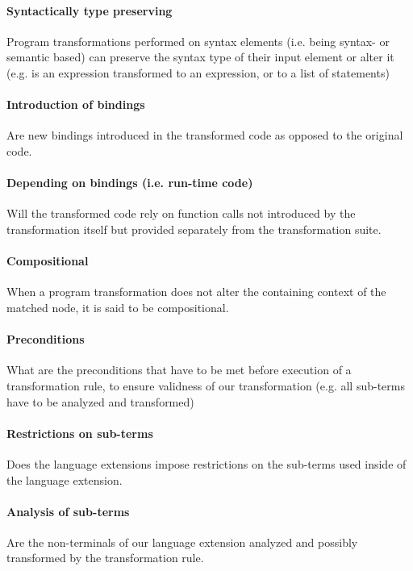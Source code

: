 \paragraph{Syntactically type preserving}
Program transformations performed on syntax elements (i.e. being syntax- or semantic based) can preserve the syntax type of their input element or alter it (e.g. is an expression transformed to an expression, or to a list of statements)

\paragraph{Introduction of bindings}
Are new bindings introduced in the transformed code as opposed to the original code.

\paragraph{Depending on bindings (i.e. run-time code)}
Will the transformed code rely on function calls not introduced by the transformation itself but provided separately from the transformation suite.

\paragraph{Compositional}
When a program transformation does not alter the containing context of the matched node, it is said to be compositional.

\paragraph{Preconditions}
What are the preconditions that have to be met before execution of a transformation rule, to ensure validness of our transformation (e.g. all sub-terms have to be analyzed and transformed)

\paragraph{Restrictions on sub-terms}
Does the language extensions impose restrictions on the sub-terms used inside of the language extension. 

\paragraph{Analysis of sub-terms}
Are the non-terminals of our language extension analyzed and possibly transformed by the transformation rule.

